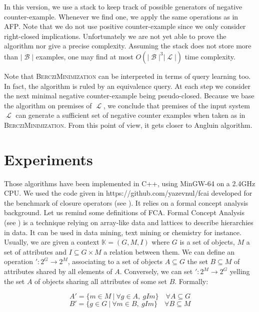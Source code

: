 \documentclass[runningheads]{llncs}
\DeclareMathOperator{\I}{\mathcal{L}}  %
\DeclareMathOperator{\imp}{\longrightarrow} %
\DeclareMathOperator{\B}{\mathcal{B}}
\begin{document}
In this version, we use a stack to keep track of possible generators of negative counter-example. Whenever we find one, we apply the same operations as in \textsc{AFP}. Note that we do not use positive counter-example since we only
consider right-closed implications. Unfortunately we are not yet able to prove the algorithm nor give a precise complexity. Assuming the stack does not store more than $|\B|$ examples, one may find at most $O(|\B|^3|\I|)$ time complexity.

Note that \textsc{BercziMinimization} can be interpreted in terms of query learning too. In fact, the algorithm is ruled by an equivalence query. At each step we consider the next minimal negative counter-example being pseudo-closed. Because we base the algorithm on premises of $\I$, we conclude that premises of
the input system $\I$ can generate a sufficient set of negative counter examples when taken as in \textsc{BercziMinimization}. From this point of view, it gets closer to Angluin algorithm.

\section{Experiments}

Those algorithms have been implemented in C++, using MinGW-64 on a 2.4GHz CPU. We used the code given in https://github.com/yazevnul/fcai developed for
the benchmark of closure operators (see \cite{bazhanov_optimizations_2014}). It relies on a formal concept analysis background. Let us remind some definitions of FCA. Formal Concept Analysis (see \cite{ganter_formal_1999}) is a technique relying on array-like data and lattices to describe hierarchies in data. It can be used in data mining, text mining or chemistry for instance. Usually, we are given a context $\mathbb{K} = (G, M, I)$ where $G$ is a set of objects, $M$ a set of attributes and $I \subseteq G \times M$ a relation between them. 
We can define an operation $': 2^G \imp 2^M$, associating to a set of objects $A \subseteq G$ the set $B \subseteq M$ of attributes shared by
all elements of $A$. Conversely, we can set $': 2^M \imp 2^G$ yelling the set
$A$ of objects sharing all attributes of some set $B$. Formally:

\[ A' = \{ m \in M \ | \ \forall g \in A,\ gIm \} \quad \forall A \subseteq G \]
\[ B' = \{ g \in G \ | \ \forall m \in B,\ gIm \} \quad \forall B \subseteq M \]
\end{document}
